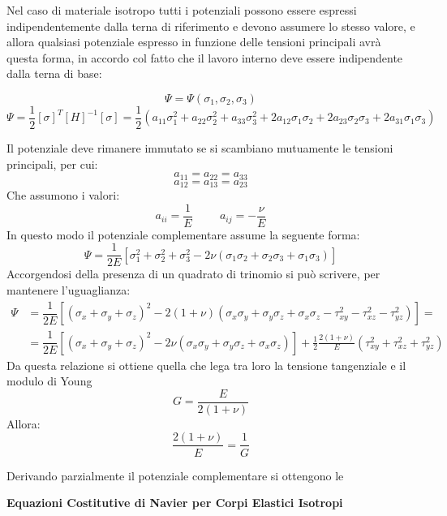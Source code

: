 \documentclass{article}
\begin{document}
\begin{adjustwidth}{2in}{}
	Nel caso di materiale isotropo tutti i potenziali possono essere espressi indipendentemente dalla terna di riferimento e devono assumere lo stesso valore, e allora qualsiasi potenziale espresso in funzione delle tensioni principali avrà questa forma, in accordo col fatto che il lavoro interno deve essere indipendente dalla terna di base:
	
	\[
	\Psi = \Psi(\sigma_1, \sigma_2, \sigma_3)
	\]
	\[
	\Psi = \dfrac{1}{2} [\sigma]^T[H]^{-1}[\sigma] = \dfrac{1}{2}\left( a_{11}\sigma_1^2 + a_{22}\sigma_2^2 + a_{33}\sigma_3^2 + 2a_{12}\sigma_1\sigma_2 + 2a_{23}\sigma_2\sigma_3 + 2a_{31}\sigma_1\sigma_3\right) 
	\]

	Il potenziale deve rimanere immutato se si scambiano mutuamente le tensioni principali, per cui: 
	\[
	a_{11} = a_{22} = a_{33}
	\]
	\[
	a_{12} = a_{13} = a_{23}
	\]
	Che assumono i valori: 
	\[
	a_{ii} = \frac{1}{E} \hspace{1cm} a_{ij} = -\frac{\nu}{E}
	\]
	 In questo modo il potenziale complementare assume la seguente forma: 
	 \[
	 \Psi = \dfrac{1}{2E}\left[ \sigma_1^2 + \sigma_2^2 + \sigma_3^2 -2\nu \left( \sigma_1\sigma_2 + \sigma_2\sigma_3 + \sigma_1\sigma_3\right) \right]
	 \]
	 Accorgendosi della presenza di un quadrato di trinomio si può scrivere, per mantenere l'uguaglianza:
	\[
	\begin{split}
	\Psi & = \dfrac{1}{2E}\left[ (\sigma_x+ \sigma_y + \sigma_z)^2 -2(1+\nu) \left( \sigma_x\sigma_y + \sigma_y\sigma_z + \sigma_x\sigma_z -\tau_{xy}^2 -\tau_{xz}^2 -\tau_{yz}^2 \right) \right] = \\
	& = \dfrac{1}{2E}\left[ (\sigma_x+ \sigma_y + \sigma_z)^2 -2\nu \left( \sigma_x\sigma_y + \sigma_y\sigma_z + \sigma_x\sigma_z \right) \right] + \frac{1}{2} \frac{2(1+\nu)}{E}\left( \tau_{xy}^2 + \tau_{xz}^2 + \tau_{yz}^2\right)  
	\end{split}
	\]
	Da questa relazione si ottiene quella che lega tra loro la tensione tangenziale e il modulo di Young
	\[G = \frac{E}{2(1+ \nu)}\] 
	Allora:
	\[\frac{2(1+\nu)}{E} = \frac{1}{G}\]
	
	Derivando parzialmente il potenziale complementare si ottengono le 
	
\begin{center}
	\textbf{Equazioni Costitutive di Navier per Corpi Elastici Isotropi}
\end{center} 


\end{adjustwidth}
\end{document}

